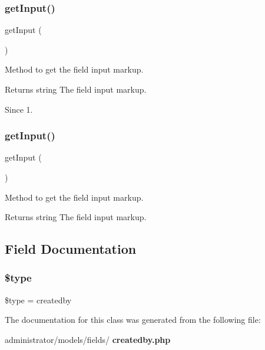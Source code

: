 \subsubsection{get\+Input()\hspace{0.1cm}{\footnotesize\ttfamily [1/2]}}
{\footnotesize\ttfamily get\+Input (\begin{DoxyParamCaption}{ }\end{DoxyParamCaption})\hspace{0.3cm}{\ttfamily [protected]}}

Method to get the field input markup.

\begin{DoxyReturn}{Returns}
string The field input markup.
\end{DoxyReturn}
\begin{DoxySince}{Since}
1. 
\end{DoxySince}
\mbox{\label{class_j_form_field_createdby_a4380f30ae9202fa49ebd2439572f9cdb}} 
\subsubsection{get\+Input()\hspace{0.1cm}{\footnotesize\ttfamily [2/2]}}
{\footnotesize\ttfamily get\+Input (\begin{DoxyParamCaption}{ }\end{DoxyParamCaption})\hspace{0.3cm}{\ttfamily [protected]}}

Method to get the field input markup.

\begin{DoxyReturn}{Returns}
string The field input markup. 
\end{DoxyReturn}


\subsection{Field Documentation}
\mbox{\label{class_j_form_field_createdby_a9a4a6fba2208984cabb3afacadf33919}} 
\subsubsection{\$type}
{\footnotesize\ttfamily \$type = \textquotesingle{}createdby\textquotesingle{}\hspace{0.3cm}{\ttfamily [protected]}}



The documentation for this class was generated from the following file\+:\begin{DoxyCompactItemize}
\item 
administrator/models/fields/\textbf{ createdby.\+php}\end{DoxyCompactItemize}
